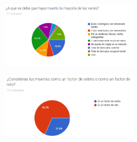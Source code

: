 \begin{figure}[H]
    \centering
    \includegraphics[width=0.6\textwidth]{Anexos/respuestas/grafica23.png}
\end{figure}

\begin{figure}[H]
    \centering
    \includegraphics[width=0.6\textwidth]{Anexos/respuestas/grafica24.png}
\end{figure}
